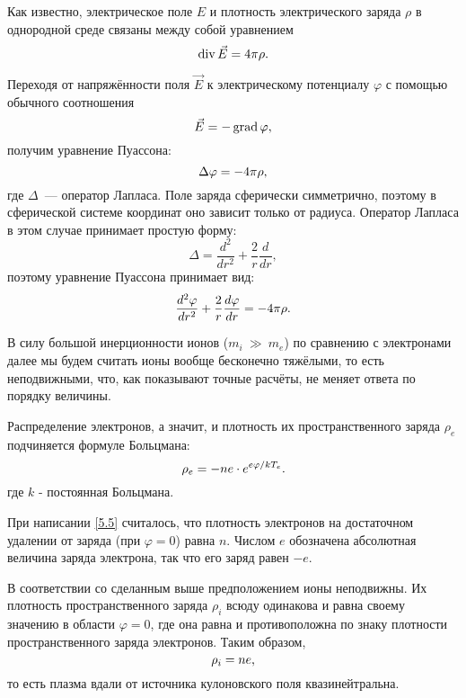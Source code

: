 Как известно, электрическое поле $E$ и плотность электрического заряда $\rho$ в
однородной среде связаны между собой
уравнением
\begin{equation}
	\eqmark{5.1}
	\Div \vec{E}=4\pi\rho.
\end{equation}

Переходя от напряжённости поля $\vec{E}$ к электрическому потенциалу $\varphi$ с
помощью обычного соотношения
\begin{equation}
	\eqmark{5.2}
	\vec{E}=-\Grad\varphi,
\end{equation}
получим уравнение Пуассона:
\begin{equation}
	\eqmark{5.3}
	\Delta\varphi=-4\pi\rho,
\end{equation}
где $\Delta$~--- оператор Лапласа. Поле заряда сферически симметрично, поэтому в
сферической системе координат оно зависит только от радиуса. Оператор Лапласа в
этом случае принимает простую форму:
\begin{equation*}
	\Delta=\frac{d^2}{dr^2}+\frac{2}{r}\frac{d}{dr},
\end{equation*}
поэтому уравнение Пуассона принимает вид:
\begin{equation}
	\eqmark{5.4}
	\frac{d^2\varphi}{dr^2}+\frac{2}{r}\frac{d\varphi}{dr}=-4\pi\rho.
\end{equation}

В силу большой инерционности ионов ($m_i~\gg~m_e$) по сравнению с электронами
далее мы будем считать ионы вообще бесконечно
тяжёлыми, то есть неподвижными, что, как показывают точные расчёты, не меняет
ответа по порядку величины.

Распределение электронов, а значит, и плотность их пространственного заряда
$\rho_e$ подчиняется формуле Больцмана:
\begin{equation}
	\eqmark{5.5}
	\rho_e=-ne\cdot e^{e\varphi/kT_e}.
\end{equation}
где $k$ - постоянная Больцмана.

При написании \eqref{5.5} считалось, что плотность электронов на достаточном
удалении от заряда (при $\varphi=0$) равна $n$.
Числом $e$ обозначена абсолютная величина заряда электрона, так что его заряд
равен $-e$.

В соответствии со сделанным выше предположением ионы неподвижны. Их плотность
пространственного заряда $\rho_i$ всюду одинакова и
равна своему значению в области $\varphi=0$, где она равна и противоположна по
знаку плотности пространственного заряда электронов.
Таким образом,
\begin{equation}
	\eqmark{5.6}
	\rho_i=ne ,
\end{equation}
то есть плазма вдали от источника кулоновского поля квазинейтральна.


